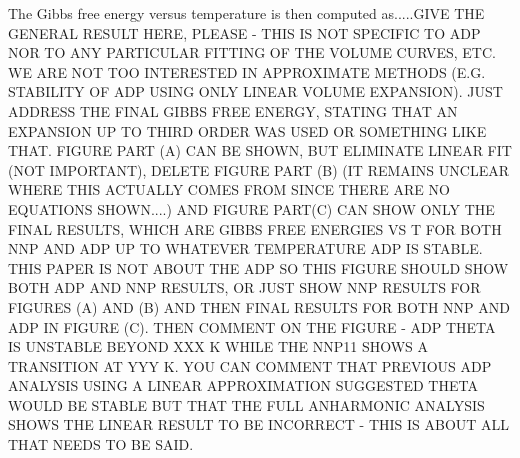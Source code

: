 \documentclass{article}
\begin{document}
The Gibbs free energy versus temperature is then computed as.....GIVE THE GENERAL RESULT HERE, PLEASE - THIS IS NOT SPECIFIC TO ADP NOR TO ANY PARTICULAR FITTING OF THE VOLUME CURVES, ETC.  WE ARE NOT TOO INTERESTED IN APPROXIMATE METHODS (E.G. STABILITY OF ADP USING ONLY LINEAR VOLUME EXPANSION).  JUST ADDRESS THE FINAL GIBBS FREE ENERGY, STATING THAT AN EXPANSION UP TO THIRD ORDER WAS USED OR SOMETHING LIKE THAT.  FIGURE PART (A) CAN BE SHOWN, BUT ELIMINATE LINEAR FIT (NOT IMPORTANT), DELETE FIGURE PART (B) (IT REMAINS UNCLEAR WHERE THIS ACTUALLY COMES FROM SINCE THERE ARE NO EQUATIONS SHOWN....) AND FIGURE PART(C) CAN SHOW ONLY THE FINAL RESULTS, WHICH ARE GIBBS FREE ENERGIES VS T FOR BOTH NNP AND ADP UP TO WHATEVER TEMPERATURE ADP IS STABLE.  THIS PAPER IS NOT ABOUT THE ADP SO THIS FIGURE SHOULD SHOW BOTH ADP AND NNP RESULTS, OR JUST SHOW NNP RESULTS FOR FIGURES (A) AND (B) AND THEN FINAL RESULTS FOR BOTH NNP AND ADP IN FIGURE (C).  THEN COMMENT ON THE FIGURE - ADP THETA IS UNSTABLE BEYOND XXX K WHILE THE NNP11 SHOWS A TRANSITION AT YYY K.
YOU CAN COMMENT THAT PREVIOUS ADP ANALYSIS USING A LINEAR APPROXIMATION SUGGESTED THETA WOULD BE STABLE BUT THAT THE FULL ANHARMONIC ANALYSIS SHOWS THE LINEAR RESULT TO BE INCORRECT - THIS IS ABOUT ALL THAT NEEDS TO BE SAID.
\end{document}
